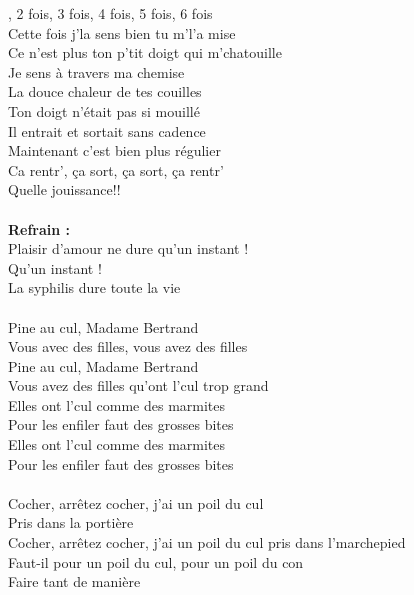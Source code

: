 
, 2 fois, 3 fois, 4 fois, 5 fois, 6 fois
\\Cette fois j'la sens bien tu m'l'a mise
\\Ce n'est plus ton p'tit doigt qui m'chatouille
\\Je sens à travers ma chemise
\\La douce chaleur de tes couilles
\\Ton doigt n'était pas si mouillé
\\Il entrait et sortait sans cadence
\\Maintenant c'est bien plus régulier
\\Ca rentr', ça sort, ça sort, ça rentr'
\\Quelle jouissance!!
\\\\\textbf{Refrain :}
\\Plaisir d'amour ne dure qu'un instant !
\\Qu'un instant !
\\La syphilis dure toute la vie
\\\\Pine au cul, Madame Bertrand
\\Vous avec des filles, vous avez des filles
\\Pine au cul, Madame Bertrand
\\Vous avez des filles qu'ont l'cul trop grand
\\Elles ont l'cul comme des marmites
\\Pour les enfiler faut des grosses bites
\\Elles ont l'cul comme des marmites
\\Pour les enfiler faut des grosses bites
\\\\Cocher, arrêtez cocher, j'ai un poil du cul
\\Pris dans la portière
\\Cocher, arrêtez cocher, j'ai un poil du cul pris dans l'marchepied
\\Faut-il pour un poil du cul, pour un poil du con
\\Faire tant de manière
